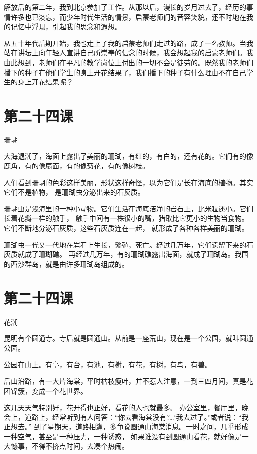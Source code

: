 \documentclass[12pt,UTF8]{ctexbook}
\begin{document}
解放后的第二年，我到北京参加了工作。从那以后，漫长的岁月过去了，经历的事情许多也已淡忘，而少年时代生活的情景，启蒙老师们的音容笑貌，还不时地在我的记忆中浮现，引起我的思念和遐想。

从五十年代后期开始，我也走上了我的启蒙老师们走过的路，成了一名教师。当我站在讲坛上向年轻人宣讲自己所崇奉的信念的时候，我会想起我的启蒙老师们。我由此想到，老师们在平凡的教学岗位上付出的一切不会是徒劳的。既然我的老师们播下的种子在他们学生的身上开花结果了，我们播下的种子有什么理由不在自己学生的身上开花结果呢？

\section{第二十四课}

珊瑚

大海退潮了，海面上露出了美丽的珊瑚，有红的，有白的，还有花的。它们有的像鹿角，有的像扇面，有的像菊花，有的像树枝。

人们看到珊瑚的色彩这样美丽，形状这样奇怪，以为它们是长在海底的植物。其实它们不是植物，
是珊瑚虫分泌出来的石灰质。

珊瑚虫是浅海里的一种小动物。它们生活在海底洁净的岩石上，比米粒还小。它们长着花瓣一样的触手，
触手中间有一株很小的嘴，猎取比它更小的生物当食物。它们不断地分泌石灰质，这些石灰质连在一起，
就形成了各种各样美丽的珊瑚。

珊瑚虫一代又一代地在岩石上生长，繁殖，死亡。经过几万年，它们遗留下来的石灰质就成了珊瑚礁。
再经过几万年，有的珊瑚礁露出海面，就成了珊瑚岛。我国的西沙群岛，就是由许多珊瑚岛组成的。

\section{第二十四课}

花潮

昆明有个圆通寺。寺后就是圆通山。从前是一座荒山，现在是一个公园，就叫圆通公园。

公园在山上。有亭，有台，有池，有榭，有花，有树，有鸟，有兽。

后山沿路，有一大片海棠，平时枯枝瘦叶，并不惹人注意，一到三四月间，真是花团锦簇，变成一个花世界。

这几天天气特别好，花开得也正好，看花的人也就最多。
办公室里，餐厅里，晚会上，道路上，经常听到有人问答：“你去看海棠没有?…‘我去过了。”或者说：“我正想去。”
到了星期天，道路相逢，多争说圆通山海棠消息。一时之间，几乎形成一种空气，甚至是一种压力，一种诱惑，
如果谁没有到圆通山看花，就好像是一大憾事，不得不挤点时间，去凑个热闹。
\end{document}
